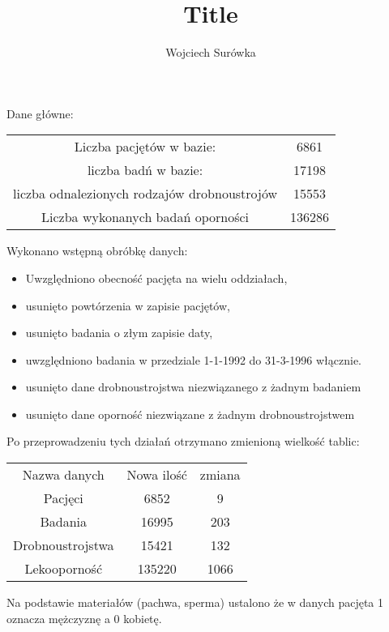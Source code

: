 \documentclass[a4paper,12pt]{article}
\title{Title}
\author{Wojciech Surówka}
\begin{document}
Dane główne:
\begin{table}[h]
\begin{center}
\begin{tabular}{cc}
\hline
Liczba pacjętów w bazie: & 6861 \\
liczba badń w bazie: & 17198 \\
liczba odnalezionych rodzajów drobnoustrojów & 15553 \\
Liczba wykonanych badań oporności & 136286  \\
\hline
\end{tabular}
\end{center}
\end{table}

Wykonano wstępną obróbkę danych:
\begin{itemize}
  \item Uwzględniono obecność pacjęta na wielu oddziałach,
  \item usunięto powtórzenia w zapisie pacjętów,
  \item usunięto badania o złym zapisie daty,
  \item uwzględniono badania w przedziale 1-1-1992 do 31-3-1996 włącznie.
  \item usunięto dane drobnoustrojstwa niezwiązanego z żadnym badaniem
  \item usunięto dane oporność niezwiązane z żadnym drobnoustrojstwem
\end{itemize}
Po przeprowadzeniu tych działań otrzymano zmienioną wielkość tablic:
\begin{table}[h]
\begin{center}
\begin{tabular}{c|c|c}
\hline
Nazwa danych & Nowa ilość & zmiana \\
Pacjęci & 6852 & 9 \\
Badania & 16995  & 203\\
Drobnoustrojstwa & 15421 & 132\\
Lekooporność & 135220 & 1066 \\
\hline
\end{tabular}
\end{center}
\end{table}

Na podstawie materiałów (pachwa, sperma) ustalono że w danych pacjęta 1 oznacza mężczyznę a 0 kobietę.
\end{document}
